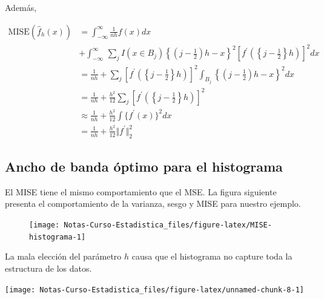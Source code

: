 \documentclass[
  12pt,
]{book}
\theoremstyle{definition}
\theoremstyle{definition}
\theoremstyle{definition}
\theoremstyle{remark}
\begin{document}
Además,

\begin{align*}
\mathrm{MISE} (\hat{f}_h(x))
& = \int_{ -\infty}^{\infty} \frac{1}{nh} f(x)dx                                                                                                                                          \\
& + \int_{ -\infty}^{\infty}\, \sum_{j}^{} I(x\in B_j) \left\{ \left( j- \frac{1}{2} \right)h -x  \right\}^2 \left [f^\prime \left( \left\{j - \frac{1}{2}\right\}h \right)  \right]^2 dx \\
& = \frac{1}{nh} + \sum_{j}^{} \left [f^\prime \left( \left\{j - \frac{1}{2}\right\}h \right)  \right]^2 \int_{ B_j}    \left\{ \left( j- \frac{1}{2} \right)h -x  \right\}^2 dx          \\
& =\frac{1}{nh} + \frac{h^2}{12} \sum_{j} \left [f^\prime \left( \left\{j - \frac{1}{2}\right\}h \right)  \right]^2                                                                       \\
& \approx \frac{1}{nh} + \frac{h^2}{12} \int \{f^\prime(x)\}^2 dx                                                                                                                         \\
& =\frac{1}{nh} + \frac{h^2}{12} \Vert f^\prime\Vert_{2}^2
\end{align*}

\hypertarget{ancho-de-banda-uxf3ptimo-para-el-histograma}{%
\subsection{Ancho de banda óptimo para el histograma}\label{ancho-de-banda-uxf3ptimo-para-el-histograma}}

El MISE tiene el mismo comportamiento que el MSE. La figura siguiente presenta el comportamiento de la varianza, sesgo y MISE para nuestro ejemplo.

\begin{figure}

{\centering \texttt{[image: Notas-Curso-Estadistica\_files/figure-latex/MISE-histograma-1]} 

}

\caption{ }\label{fig:MISE-histograma}
\end{figure}

La mala elección del parámetro \(h\) causa que el histograma no capture toda la estructura de los datos.

\begin{center}\texttt{[image: Notas-Curso-Estadistica\_files/figure-latex/unnamed-chunk-8-1]} \end{center}
\end{document}
